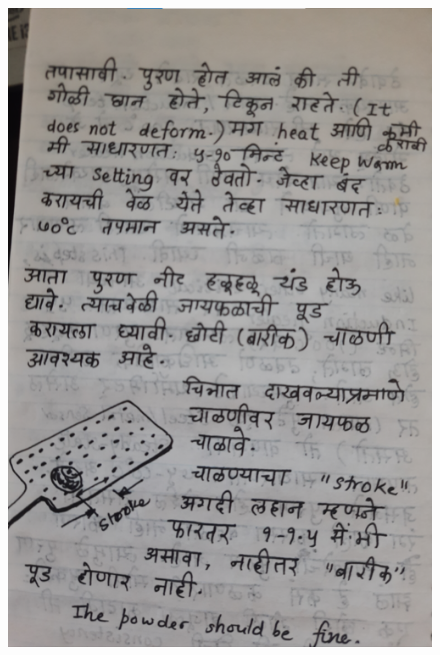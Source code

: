 \documentclass[17pt]{extarticle}  %
\begin{document}
\begin{figure}[h!]
    \centering
    \includegraphics{img/04-s.png}
\end{figure}
\end{document}
